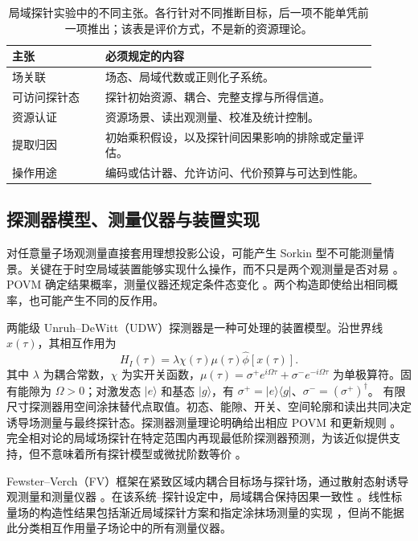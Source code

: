 \documentclass[UTF8,11pt,a4paper,fontset=none]{ctexart}
\begin{document}
\begin{table}[t]
\centering\small
\caption{局域探针实验中的不同主张。各行针对不同推断目标，后一项不能单凭前一项推出；该表是评价方式，不是新的资源理论。}
\label{tab:operational-levels}
\begin{tabular}{p{0.23\linewidth}p{0.67\linewidth}}
\toprule
主张 & 必须规定的内容\\
\midrule
场关联 & 场态、局域代数或正则化子系统。\\
可访问探针态 & 探针初始资源、耦合、完整支撑与所得信道。\\
资源认证 & 资源场景、读出观测量、校准及统计控制。\\
提取归因 & 初始乘积假设，以及探针间因果影响的排除或定量评估。\\
操作用途 & 编码或估计器、允许访问、代价预算与可达到性能。\\
\bottomrule
\end{tabular}
\end{table}

\subsection{探测器模型、测量仪器与装置实现}
对任意量子场观测量直接套用理想投影公设，可能产生 Sorkin 型不可能测量情景。关键在于时空局域装置能够实现什么操作，而不只是两个观测量是否对易 \cite{Sorkin1993,BorstenJubbKells2021,Papageorgiou2024}。POVM 确定结果概率，测量仪器还规定条件态变化 \cite{DaviesLewis1970,Ozawa1984}。两个构造即使给出相同概率，也可能产生不同的反作用。

两能级 Unruh--DeWitt（UDW）探测器是一种可处理的装置模型。沿世界线 $x(\tau)$，其相互作用为
\begin{equation}
H_I(\tau)=\lambda\chi(\tau)\mu(\tau)\hat\phi[x(\tau)].
\label{eq:udw}
\end{equation}
其中 $\lambda$ 为耦合常数，$\chi$ 为实开关函数，$\mu(\tau)=\sigma^+e^{i\Omega\tau}+\sigma^-e^{-i\Omega\tau}$ 为单极算符。固有能隙为 $\Omega>0$；对激发态 $|e\rangle$ 和基态 $|g\rangle$，有 $\sigma^+=|e\rangle\langle g|$、$\sigma^-=(\sigma^+)^\dagger$。
有限尺寸探测器用空间涂抹替代点取值。初态、能隙、开关、空间轮廓和读出共同决定诱导场测量与最终探针态。探测器测量理论明确给出相应 POVM 和更新规则 \cite{PoloGomez2022}。完全相对论的局域场探针在特定范围内再现最低阶探测器预测，为该近似提供支持，但不意味着所有探针模型或微扰阶数等价 \cite{GrimmerTorresMartinez2021,PercheLocalizedQFT2024,Perche2024}。

Fewster--Verch（FV）框架在紧致区域内耦合目标场与探针场，通过散射态射诱导观测量和测量仪器 \cite{FewsterVerch2020}。在该系统--探针设定中，局域耦合保持因果一致性 \cite{BostelmannFewsterRuep2021}。线性标量场的构造性结果包括渐近局域探针方案和指定涂抹场测量的实现 \cite{FewsterJubbRuep2023,MandryschNavascues2025}，但尚不能据此分类相互作用量子场论中的所有测量仪器。
\end{document}

